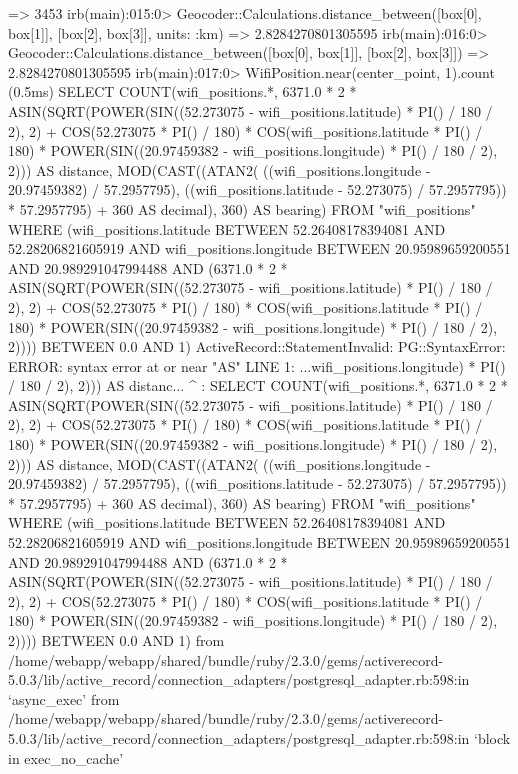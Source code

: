 => 3453
irb(main):015:0> Geocoder::Calculations.distance_between([box[0], box[1]], [box[2], box[3]], units: :km)
=> 2.8284270801305595
irb(main):016:0> Geocoder::Calculations.distance_between([box[0], box[1]], [box[2], box[3]])
=> 2.8284270801305595
irb(main):017:0> WifiPosition.near(center_point, 1).count
   (0.5ms)  SELECT COUNT(wifi_positions.*, 6371.0 * 2 * ASIN(SQRT(POWER(SIN((52.273075 - wifi_positions.latitude) * PI() / 180 / 2), 2) + COS(52.273075 * PI() / 180) * COS(wifi_positions.latitude * PI() / 180) * POWER(SIN((20.97459382 - wifi_positions.longitude) * PI() / 180 / 2), 2))) AS distance, MOD(CAST((ATAN2( ((wifi_positions.longitude - 20.97459382) / 57.2957795), ((wifi_positions.latitude - 52.273075) / 57.2957795)) * 57.2957795) + 360 AS decimal), 360) AS bearing) FROM "wifi_positions" WHERE (wifi_positions.latitude BETWEEN 52.26408178394081 AND 52.28206821605919 AND wifi_positions.longitude BETWEEN 20.95989659200551 AND 20.989291047994488 AND (6371.0 * 2 * ASIN(SQRT(POWER(SIN((52.273075 - wifi_positions.latitude) * PI() / 180 / 2), 2) + COS(52.273075 * PI() / 180) * COS(wifi_positions.latitude * PI() / 180) * POWER(SIN((20.97459382 - wifi_positions.longitude) * PI() / 180 / 2), 2)))) BETWEEN 0.0 AND 1)
ActiveRecord::StatementInvalid: PG::SyntaxError: ERROR:  syntax error at or near "AS"
LINE 1: ...wifi_positions.longitude) * PI() / 180 / 2), 2))) AS distanc...
                                                             ^
: SELECT COUNT(wifi_positions.*, 6371.0 * 2 * ASIN(SQRT(POWER(SIN((52.273075 - wifi_positions.latitude) * PI() / 180 / 2), 2) + COS(52.273075 * PI() / 180) * COS(wifi_positions.latitude * PI() / 180) * POWER(SIN((20.97459382 - wifi_positions.longitude) * PI() / 180 / 2), 2))) AS distance, MOD(CAST((ATAN2( ((wifi_positions.longitude - 20.97459382) / 57.2957795), ((wifi_positions.latitude - 52.273075) / 57.2957795)) * 57.2957795) + 360 AS decimal), 360) AS bearing) FROM "wifi_positions" WHERE (wifi_positions.latitude BETWEEN 52.26408178394081 AND 52.28206821605919 AND wifi_positions.longitude BETWEEN 20.95989659200551 AND 20.989291047994488 AND (6371.0 * 2 * ASIN(SQRT(POWER(SIN((52.273075 - wifi_positions.latitude) * PI() / 180 / 2), 2) + COS(52.273075 * PI() / 180) * COS(wifi_positions.latitude * PI() / 180) * POWER(SIN((20.97459382 - wifi_positions.longitude) * PI() / 180 / 2), 2)))) BETWEEN 0.0 AND 1)
        from /home/webapp/webapp/shared/bundle/ruby/2.3.0/gems/activerecord-5.0.3/lib/active_record/connection_adapters/postgresql_adapter.rb:598:in `async_exec'
        from /home/webapp/webapp/shared/bundle/ruby/2.3.0/gems/activerecord-5.0.3/lib/active_record/connection_adapters/postgresql_adapter.rb:598:in `block in exec_no_cache'
